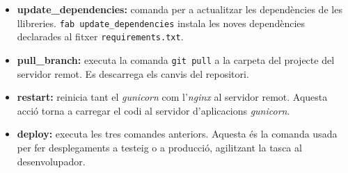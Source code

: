 \begin{itemize}
	\item \textbf{update\_dependencies:} comanda per a actualitzar les dependències de les llibreries. \texttt{fab update\_dependencies} instala les noves dependències declarades al fitxer \texttt{requirements.txt}.
	\item \textbf{pull\_branch:} executa la comanda \texttt{git pull} a la carpeta del projecte del servidor remot. Es descarrega els canvis del repositori.
	\item \textbf{restart:} reinicia tant el \emph{gunicorn} com l'\emph{nginx} al servidor remot. Aquesta acció torna a carregar el codi al servidor d'aplicacions \emph{gunicorn}.
	\item \textbf{deploy:} executa les tres comandes anteriors. Aquesta és la comanda usada per fer desplegaments a testeig o a producció, agilitzant la tasca al desenvolupador.
\end{itemize}